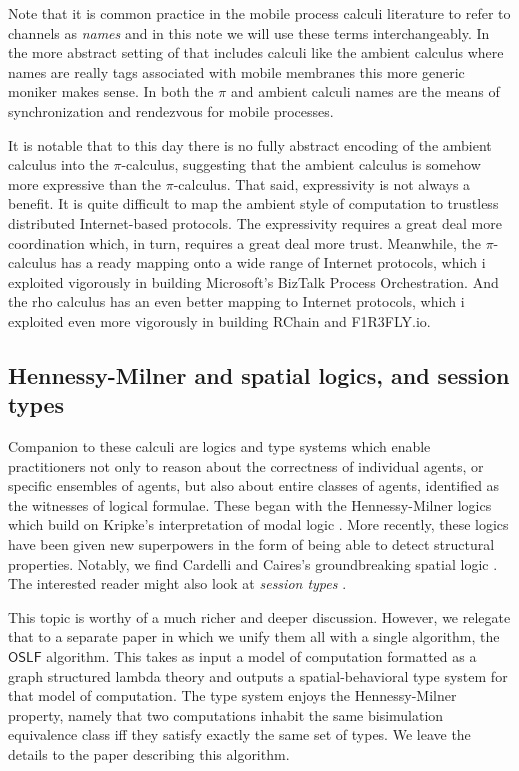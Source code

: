 Note that it is common practice in the mobile process calculi
literature to refer to channels as \emph{names} and in this note we
will use these terms interchangeably. In the more abstract setting of
that includes calculi like the ambient calculus where names are really
tags associated with mobile membranes this more generic moniker makes
sense. In both the $\pi$ and ambient calculi names are the means of
synchronization and rendezvous for mobile processes.

It is notable that to this day there is no fully abstract encoding of
the ambient calculus into the $\pi$-calculus, suggesting that the
ambient calculus is somehow more expressive than the
$\pi$-calculus. That said, expressivity is not always a benefit. It is
quite difficult to map the ambient style of computation to trustless
distributed Internet-based protocols. The expressivity requires a
great deal more coordination which, in turn, requires a great deal
more trust. Meanwhile, the $\pi$-calculus has a ready mapping onto a
wide range of Internet protocols, which i exploited vigorously in
building Microsoft's BizTalk Process Orchestration. And the rho
calculus has an even better mapping to Internet protocols, which i
exploited even more vigorously in building RChain and F1R3FLY.io.

\subsection{Hennessy-Milner and spatial logics, and session types}

Companion to these calculi are logics and type systems which enable
practitioners not only to reason about the correctness of individual
agents, or specific ensembles of agents, but also about entire classes
of agents, identified as the witnesses of logical formulae. These
began with the Hennessy-Milner logics which build on Kripke's
interpretation of modal logic \cite{milner91polyadicpi}. More
recently, these logics have been given new superpowers in the form of
being able to detect structural properties. Notably, we find Cardelli
and Caires's groundbreaking spatial logic
\cite{DBLP:conf/fossacs/Caires04} \cite{DBLP:journals/iandc/CairesC03}
\cite{DBLP:journals/tcs/CairesC04}. The interested reader might also
look at \emph{session types}
\cite{DBLP:conf/wsfm/Dezani-Ciancaglinid09}.

This topic is worthy of a much richer and deeper discussion. However,
we relegate that to a separate paper in which we unify them all with a
single algorithm, the $\mathsf{OSLF}$ algorithm. This takes as input a
model of computation formatted as a graph structured lambda theory and
outputs a spatial-behavioral type system for that model of
computation. The type system enjoys the Hennessy-Milner property,
namely that two computations inhabit the same bisimulation equivalence
class iff they satisfy exactly the same set of types. We leave the
details to the paper describing this algorithm.

